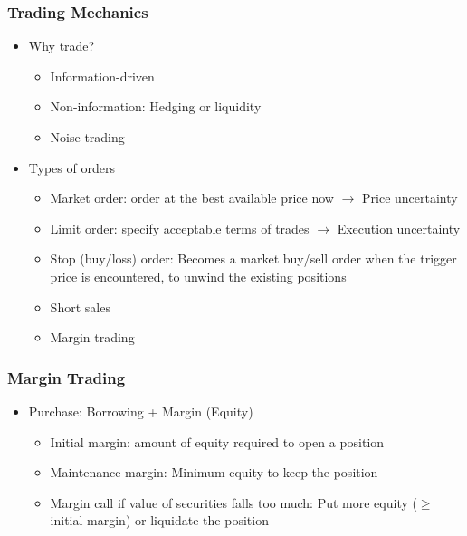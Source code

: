 \documentclass[10pt]{beamer}
\begin{document}
	\begin{frame}
		\frametitle{Trading Mechanics}
		
		\begin{itemize}
			\item Why trade?
			\begin{itemize}	
				\item Information-driven 
				\item Non-information: Hedging or liquidity 
				\item Noise trading
			\end{itemize}	
			
			\bigskip
			
			\item Types of orders
			\begin{itemize}	
				\item Market order: order at the best available price now $\rightarrow$ Price uncertainty
				\item Limit order: specify acceptable terms of trades $\rightarrow$ Execution uncertainty
				\item Stop (buy/loss) order: Becomes a market buy/sell order when the trigger price is encountered, to unwind the existing positions
				\item Short sales
				\item Margin trading
			\end{itemize}
			
		\end{itemize}
	\end{frame}
	\begin{frame}
		\frametitle{Margin Trading}
		
		\begin{itemize} \vspace{5pt} \itemsep10pt
			\item Purchase: Borrowing + Margin (Equity)
			\smallskip		
			\begin{itemize} \vspace{5pt} \itemsep10pt
				\item Initial margin: amount of equity required to open a position
				\item Maintenance margin: Minimum equity to keep the position
				\item Margin call if value of securities falls too much: Put more equity ($\ge$ initial margin) or liquidate the position
			\end{itemize}
			
		\end{itemize}
	\end{frame}
\end{document}
